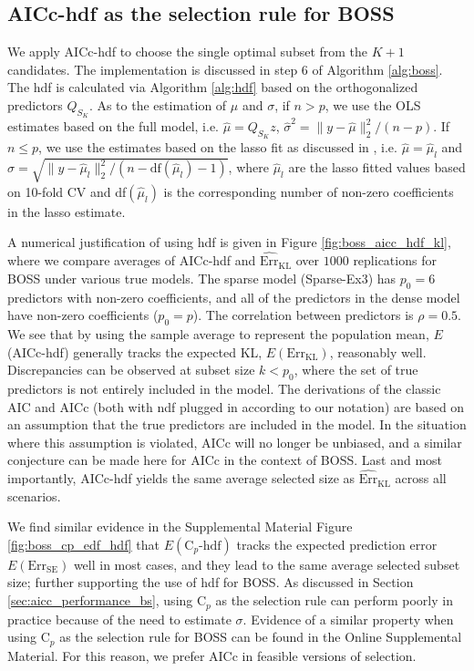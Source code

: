 \subsection{AICc-hdf as the selection rule for BOSS}

We apply AICc-hdf to choose the single optimal subset from the $K+1$ candidates. The implementation is discussed in step 6 of Algorithm \ref{alg:boss}. The hdf is calculated via Algorithm \ref{alg:hdf} based on the orthogonalized predictors $Q_{S_K}$. As to the estimation of $\mu$ and $\sigma$, if $n>p$, we use the OLS estimates based on the full model, i.e. $\hat{\mu}=Q_{S_{K}} z$, $\hat{\sigma}^2 = \lVert y-\hat{\mu} \rVert_2^2/(n-p)$. If $n \le p$, we use the estimates based on the lasso fit as discussed in \citet{reid2016study}, i.e. $\hat{\mu}=\hat{\mu}_l$ and $\hat{\sigma} = \sqrt{\lVert y-\hat{\mu}_l \rVert_2^2 / (n-\text{df}(\hat{\mu}_l)-1)}$, where $\hat{\mu}_l$ are the lasso fitted values based on 10-fold CV and df$(\hat{\mu}_l)$ is the corresponding number of non-zero coefficients in the lasso estimate. 

A numerical justification of using hdf is given in Figure \ref{fig:boss_aicc_hdf_kl}, where we compare averages of AICc-hdf and $\widehat{\text{Err}}_{\text{KL}}$ over $1000$ replications for BOSS under various true models. The sparse model (Sparse-Ex3) has $p_0=6$ predictors with non-zero coefficients, and all of the predictors in the dense model have non-zero coefficients ($p_0=p$). The correlation between predictors is $\rho=0.5$. We see that by using the sample average to represent the population mean, $E$(AICc-hdf) generally tracks the expected KL, $E(\text{Err}_{\text{KL}})$, reasonably well. Discrepancies can be observed at subset size $k<p_0$, where the set of true predictors is not entirely included in the model. The derivations of the classic AIC and AICc (both with ndf plugged in according to our notation) are based on an assumption that the true predictors are included in the model. In the situation where this assumption is violated, AICc will no longer be unbiased, and a similar conjecture can be made here for AICc in the context of BOSS. Last and most importantly, AICc-hdf yields the same average selected size as $\widehat{\text{Err}}_{\text{KL}}$ across all scenarios.

We find similar evidence in the Supplemental Material Figure \ref{fig:boss_cp_edf_hdf} that $E(\text{C}_p\text{-hdf})$ tracks the expected prediction error $E(\text{Err}_\text{SE})$ well in most cases, and they lead to the same average selected subset size; further supporting the use of hdf for BOSS. As discussed in Section \ref{sec:aicc_performance_bs}, using C$_p$ as the selection rule can perform poorly in practice because of the need to estimate $\sigma$. Evidence of a similar property when using C$_p$ as the selection rule for BOSS can be found in the Online Supplemental Material. For this reason, we prefer AICc in feasible versions of selection. 

